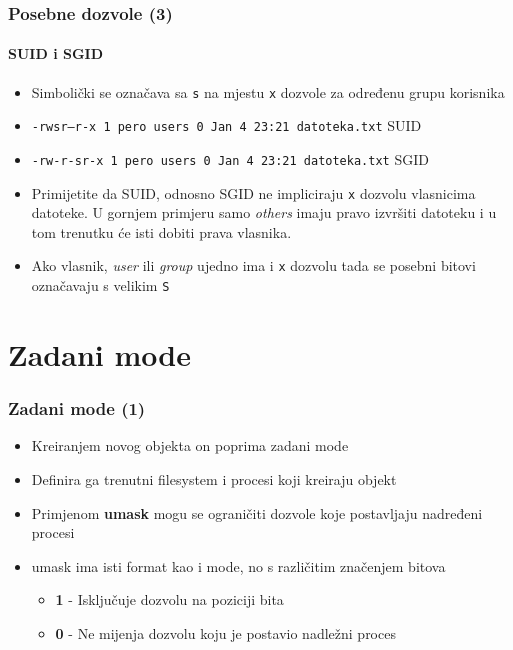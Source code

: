 \documentclass[table,usenames,dvipsnames]{beamer}
\newcommand{\shell}[1]{\texttt{#1}}
\begin{document}
\begin{frame}[t]
	\frametitle{Posebne dozvole (3)}
	\framesubtitle{SUID i SGID}
\begin{itemize}
	\item Simbolički se označava sa \shell{s} na mjestu \shell{x} dozvole za određenu grupu korisnika
	\item[] {\footnotesize \shell{-rwsr--r-x 1 pero users 0 Jan  4 23:21 datoteka.txt} \hfill SUID }
	\item[] {\footnotesize \shell{-rw-r-sr-x 1 pero users 0 Jan  4 23:21 datoteka.txt} \hfill SGID }
\end{itemize}
\begin{itemize}
	\item Primijetite da SUID, odnosno SGID ne impliciraju \shell{x} dozvolu vlasnicima datoteke. U gornjem primjeru samo \textit{others} imaju pravo izvršiti datoteku i u tom trenutku će isti dobiti prava vlasnika.
	\item Ako vlasnik, \textit{user} ili \textit{group} ujedno ima i \shell{x} dozvolu tada se posebni bitovi označavaju s velikim \shell{S}
\end{itemize}
\end{frame}

\section{Zadani mode}
\begin{frame}[t]
\frametitle{Zadani mode (1)}
\begin{itemize}
	\item Kreiranjem novog objekta on poprima zadani mode
	\item Definira ga trenutni filesystem i procesi koji kreiraju objekt
\end{itemize}
\begin{itemize}
	\item Primjenom \textbf{umask} mogu se ograničiti dozvole koje postavljaju nadređeni procesi
	\item umask ima isti format kao i mode, no s različitim značenjem bitova
	\begin{itemize}
		\item \textbf{1} - Isključuje dozvolu na poziciji bita
		\item \textbf{0} - Ne mijenja dozvolu koju je postavio nadležni proces
	\end{itemize}
\end{itemize}
\end{frame}
\end{document}
